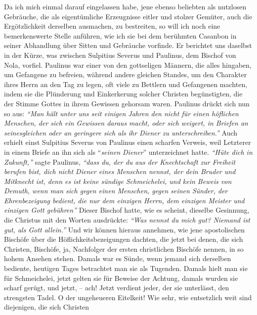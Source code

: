 Da ich mich einmal darauf eingelassen habe, jene ebenso beliebten als nutzlosen
Gebräuche, die als eigentümliche Erzeugnisse eitler und stolzer Gemüter, auch
die Ergötzlichkeit derselben ausmachen, zu bestreiten, so will ich noch eine
bemerkenswerte Stelle anführen, wie ich sie bei dem berühmten
Casanbon in
seiner Abhandlung über Sitten und Gebräuche vorfinde. Er berichtet uns daselbst
in der Kürze, was zwischen Sulpitius Severus
und Paulinus,
dem Bischof von
Nola, vorfiel. Paulinus war einer von den gottseligen Männern, die alles
hingaben, um Gefangene zu befreien, während andere gleichen Standes, um den
Charakter ihres Herrn an den Tag zu legen, oft viele zu Bettlern und Gefangenen
machten, indem sie die Plünderung und Einkerkerung solcher Christen
begünstigten, die der Stimme Gottes in ihrem Gewissen gehorsam waren. Paulinus
drückt sich nun so aus: \textit{"`Man hält unter uns seit einigen Jahren den
nicht für
einen höflichen Menschen, der sich ein Gewissen daraus macht, oder sich weigert,
in Briefen an seinesgleichen oder an geringere sich als ihr Diener zu
unterschreiben."'} Auch erhielt einst Sulpitius Severus von Paulinus einen
scharfen Verweis, weil Letzterer in einem Briefe an ihn sich
als "`\textit{seinen Diener}"'
unterzeichnet hatte. \textit{"`Hüte dich in Zukunft,"'} sagte Paulinus,
\textit{"`dass du, der du
aus der Knechtschaft zur Freiheit berufen bist, dich nicht Diener eines Menschen
nennst, der dein Bruder und Mitknecht ist, denn es ist keine sündige
Schmeichelei, und kein Beweis von Demuth, wenn man sich gegen einen Menschen,
gegen seinen Sünder, der Ehrenbezeigung bedient, die nur dem einzigen Herrn, dem
einzigen Meister und einzigen Gott gebühren"'} Dieser Bischof hatte, wie es
scheint, dieselbe Gesinnung, die Christus mit den Worten ausdrückte:
\textit{"`Was
nennst du mich gut? Niemand ist gut, als Gott allein."'} Und wir können hieraus
annehmen, wie jene apostolischen Bischöfe über die Höflichkeitsbezeigungen
dachten, die jetzt bei denen, die sich Christen, Bischöfe, ja, Nachfolger der
ersten christlichen Bischöfe nennen, in so hohem Ansehen stehen. Damals war es
Sünde, wenn jemand sich derselben bediente, heutigen Tages betrachtet man sie
als Tugenden. Damals hielt man sie für Schmeichelei, jetzt gelten sie für
Beweise der Achtung, damals wurden sie scharf gerügt, und jetzt, -- ach! Jetzt
verdient jeder, der sie unterlässt, den strengsten Tadel. O der ungeheueren
Eitelkeit! Wie sehr, wie entsetzlich weit sind diejenigen, die sich Christen
